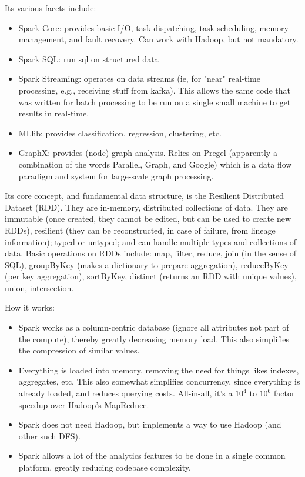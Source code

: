 \documentclass{article}
\begin{document}
\begin{itemize}
	Its various facets include:
	\begin{itemize}
		\item Spark Core: provides basic I/O, task dispatching, task scheduling, memory management, and fault recovery. Can work with Hadoop, but not mandatory.
		\item Spark SQL: run sql on structured data
		\item Spark Streaming: operates on data streams (ie, for "near" real-time processing, e.g., receiving stuff from kafka). This allows the same code that was written for batch processing to be run on a single small machine to get results in real-time.
		\item MLlib: provides classification, regression, clustering, etc. 
		\item GraphX: provides (node) graph analysis. Relies on Pregel (apparently a combination of the words Parallel, Graph, and Google) which is a data flow paradigm and system for large-scale graph processing.
	\end{itemize}

	Its core concept, and fundamental data structure, is the Resilient Distributed Dataset (RDD). They are in-memory, distributed collections of data. They are immutable (once created, they cannot be edited, but can be used to create new RDDs), resilient (they can be reconstructed, in case of failure, from lineage information); typed or untyped; and can handle multiple types and collections of data. Basic operations on RDDs include: map, filter, reduce, join (in the sense of SQL), groupByKey (makes a dictionary to prepare aggregation), reduceByKey (per key aggregation), sortByKey, distinct (returns an RDD with unique values), union, intersection.

    How it works:
    \begin{itemize}
		\item Spark works as a column-centric database (ignore all attributes not part of the compute), thereby greatly decreasing memory load. This also simplifies the compression of similar values.
		\item Everything is loaded into memory, removing the need for things likes indexes, aggregates, etc. This also somewhat simplifies concurrency, since everything is already loaded, and reduces querying costs. All-in-all, it's a $10^4$ to $10^6$ factor speedup over Hadoop's MapReduce.
		\item Spark does not need Hadoop, but implements a way to use Hadoop (and other such DFS).
		\item Spark allows a lot of the analytics features to be done in a single common platform, greatly reducing codebase complexity.
    \end{itemize}



\end{itemize}
\end{document}
